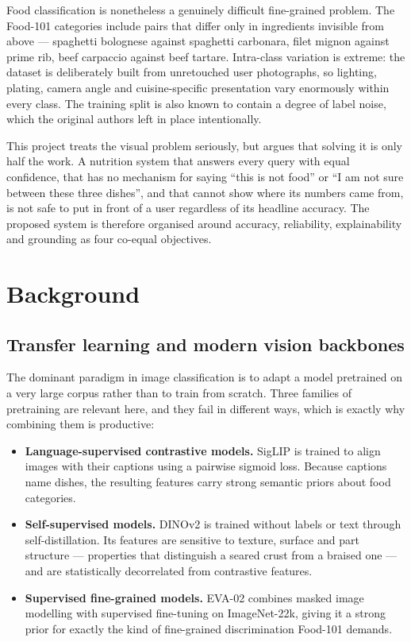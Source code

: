 \documentclass[12pt,a4paper,oneside]{report}
\begin{document}
Food classification is nonetheless a genuinely difficult fine-grained problem.
The Food-101 categories include pairs that differ only in ingredients invisible
from above --- spaghetti bolognese against spaghetti carbonara, filet mignon
against prime rib, beef carpaccio against beef tartare. Intra-class variation is
extreme: the dataset is deliberately built from unretouched user photographs,
so lighting, plating, camera angle and cuisine-specific presentation vary
enormously within every class. The training split is also known to contain a
degree of label noise, which the original authors left in place intentionally.

This project treats the visual problem seriously, but argues that solving it is
only half the work. A nutrition system that answers every query with equal
confidence, that has no mechanism for saying ``this is not food'' or ``I am not
sure between these three dishes'', and that cannot show where its numbers came
from, is not safe to put in front of a user regardless of its headline accuracy.
The proposed system is therefore organised around accuracy, reliability,
explainability and grounding as four co-equal objectives.

\chapter{Background}

\section{Transfer learning and modern vision backbones}

The dominant paradigm in image classification is to adapt a model pretrained on
a very large corpus rather than to train from scratch. Three families of
pretraining are relevant here, and they fail in different ways, which is exactly
why combining them is productive:

\begin{itemize}
  \item \textbf{Language-supervised contrastive models.} SigLIP is trained to
  align images with their captions using a pairwise sigmoid loss. Because
  captions name dishes, the resulting features carry strong semantic priors
  about food categories.
  \item \textbf{Self-supervised models.} DINOv2 is trained without labels or
  text through self-distillation. Its features are sensitive to texture, surface
  and part structure --- properties that distinguish a seared crust from a
  braised one --- and are statistically decorrelated from contrastive features.
  \item \textbf{Supervised fine-grained models.} EVA-02 combines masked image
  modelling with supervised fine-tuning on ImageNet-22k, giving it a strong
  prior for exactly the kind of fine-grained discrimination Food-101 demands.
\end{itemize}
\end{document}
